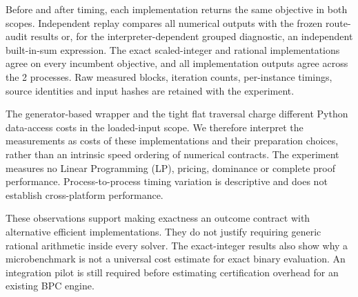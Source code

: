 Before and after timing, each implementation returns the same objective in both scopes. Independent replay compares all numerical outputs with the frozen route-audit results or, for the interpreter-dependent grouped diagnostic, an independent built-in-sum expression. The exact scaled-integer and rational implementations agree on every incumbent objective, and all implementation outputs agree across the 2 processes. Raw measured blocks, iteration counts, per-instance timings, source identities and input hashes are retained with the experiment.

The generator-based  wrapper and the tight flat traversal charge different Python data-access costs in the loaded-input scope. We therefore interpret the measurements as costs of these implementations and their preparation choices, rather than an intrinsic speed ordering of numerical contracts. The experiment measures no Linear Programming (LP), pricing, dominance or complete proof performance. Process-to-process timing variation is descriptive and does not establish cross-platform performance.

These observations support making exactness an outcome contract with alternative efficient implementations. They do not justify requiring generic rational arithmetic inside every solver. The exact-integer results also show why a  microbenchmark is not a universal cost estimate for exact binary evaluation. An integration pilot is still required before estimating certification overhead for an existing BPC engine.


